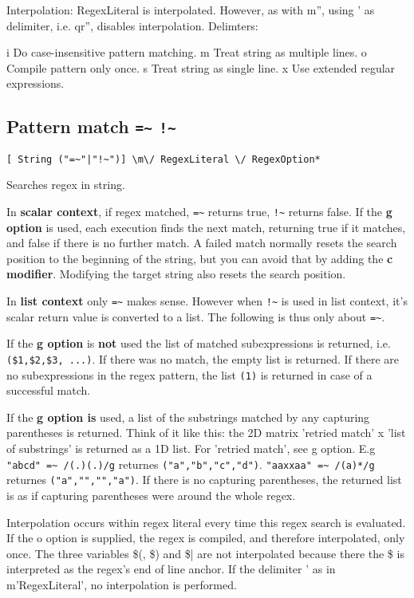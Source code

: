 \documentclass{article}
\begin{document}
\begin{description}
{Interpolation: RegexLiteral is interpolated. However, as with m'', using ' as
delimiter, i.e. qr'', disables interpolation.  Delimters:

    i	Do case-insensitive pattern matching.
    m	Treat string as multiple lines.
    o	Compile pattern only once.
    s	Treat string as single line.
    x	Use extended regular expressions.

\subsection{Pattern match \verb|=~| \verb|!~|}

\begin{verbatim}
[ String ("=~"|"!~")] \m\/ RegexLiteral \/ RegexOption*
\end{verbatim}

Searches regex in string.

In \textbf{scalar context}, if regex matched, \verb|=~| returns true, \verb|!~|
returns false. If the \textbf{g option} is used, each execution finds the next
match, returning true if it matches, and false if there is no further match. A
failed match normally resets the search position to the beginning of the string,
but you can avoid that by adding the \textbf{c modifier}. Modifying the target
string also resets the search position.

In \textbf{list context} only \verb|=~| makes sense. However when \verb|!~| is
used in list context, it's scalar return value is converted to a list. The
following is thus only about \verb|=~|.

If the \textbf{g option} is \textbf{not} used the list of matched subexpressions
is returned, i.e. \verb|($1,$2,$3, ...)|. If there was no match, the empty list
is returned. If there are no subexpressions in the regex pattern, the list
\verb|(1)| is returned in case of a successful match.

If the \textbf{g option is} used, a list of the substrings matched by any
capturing parentheses is returned. Think of it like this: the 2D matrix 'retried
match' x 'list of substrings' is returned as a 1D list. For 'retried match', see
g option. E.g \verb|"abcd" =~ /(.)(.)/g| returnes \verb|("a","b","c","d")|.
\verb|"aaxxaa" =~ /(a)*/g| returnes \verb|("a","","","a")|. If there is no capturing
parentheses, the returned list is as if capturing parentheses were around the
whole regex.


Interpolation occurs within regex literal every time this regex search is
evaluated. If the o option is supplied, the regex is compiled, and therefore
interpolated, only once. The three variables \$(, \$) and \$| are not
interpolated because there the \$ is interpreted as the regex's end of line
anchor. If the delimiter ' as in m'RegexLiteral', no interpolation is performed.

}
\end{description}
\end{document}
